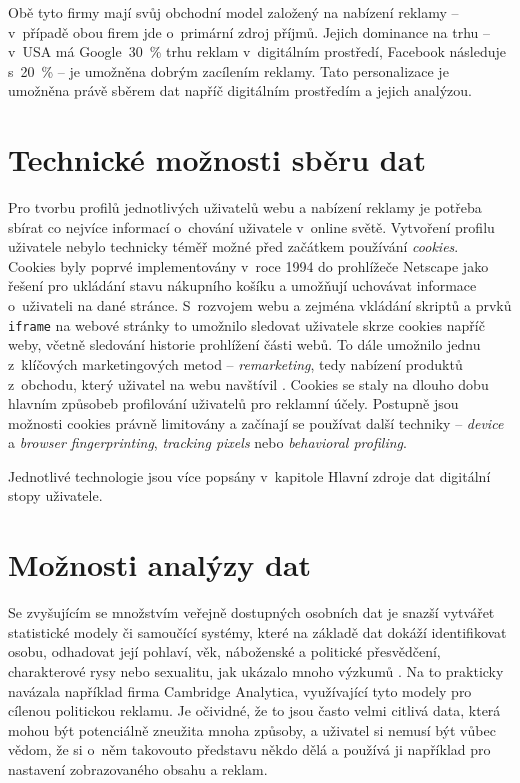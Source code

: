 Obě tyto firmy mají svůj obchodní model založený na nabízení reklamy -- v~případě obou firem jde o~primární zdroj příjmů. Jejich dominance na trhu -- v~USA má Google~30~\% trhu reklam \citep{google-ads} v~digitálním prostředí, Facebook následuje s~20~\% -- je umožněna dobrým zacílením reklamy. Tato personalizace je umožněna právě sběrem dat napříč digitálním prostředím a jejich analýzou.

\section{Technické možnosti sběru dat}

Pro tvorbu profilů jednotlivých uživatelů webu a nabízení reklamy je potřeba sbírat co nejvíce informací o~chování uživatele v~online světě. Vytvoření profilu uživatele nebylo technicky téměř možné před začátkem používání \textit{cookies}.\\
Cookies byly poprvé implementovány v~roce 1994 do prohlížeče Netscape jako řešení pro ukládání stavu nákupního košíku \citep{cookies-history} a umožňují uchovávat informace o~uživateli na dané stránce. S~rozvojem webu a zejména vkládání skriptů a prvků \verb|iframe| na webové stránky to umožnilo sledovat uživatele skrze cookies napříč weby, včetně sledování historie prohlížení části webů.
To dále umožnilo jednu z~klíčových marketingových metod -- \textit{remarketing}, tedy nabízení produktů z~obchodu, který uživatel na webu navštívil \citep{scott-cookies}. Cookies se staly na dlouho dobu hlavním způsobeb profilování uživatelů pro reklamní účely. Postupně jsou možnosti cookies právně limitovány a začínají se používat další techniky -- \textit{device} a \textit{browser fingerprinting}, \textit{tracking pixels} nebo \textit{behavioral profiling}.

Jednotlivé technologie jsou více popsány v~kapitole Hlavní zdroje dat digitální stopy uživatele.

\section{Možnosti analýzy dat}
Se zvyšujícím se množstvím veřejně dostupných osobních dat je snazší vytvářet statistické modely či samoučící systémy, které na základě dat dokáží identifikovat osobu, odhadovat její pohlaví, věk, náboženské a politické přesvědčení, charakterové rysy nebo sexualitu, jak ukázalo mnoho výzkumů \citep{big-5-predictions}.
Na to prakticky navázala například firma Cambridge Analytica, využívající tyto modely pro cílenou politickou reklamu. Je očividné, že to jsou často velmi citlivá data, která mohou být potenciálně zneužita mnoha způsoby, a uživatel si nemusí být vůbec vědom, že si o~něm takovouto představu někdo dělá a používá ji například pro nastavení zobrazovaného obsahu a reklam. 

